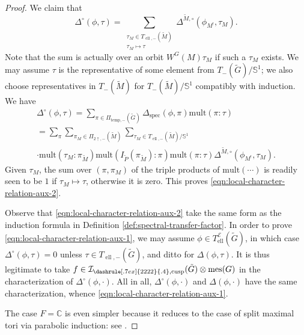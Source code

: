 \documentclass[11pt, a4paper, openany]{book}
\newenvironment{Proof of claim}
  {\renewcommand\qedsymbol{$\blacksquare$}\begin{proof}[Proof of claim]}
  {\end{proof}}
\newcommand{\CC}{\ensuremath{\mathbb{C}}}
\newcommand{\mes}{\operatorname{mes}}
\newcommand{\Endo}{\ensuremath{\mathcal{E}}}
\newcommand{\orbI}{\ensuremath{\mathcal{I}}}
\newcommand{\cusp}{\operatorname{cusp}}
\newcommand{\elli}{\operatorname{ell}}
\newcommand{\asp}{\ensuremath{\dashrule[.7ex]{2 2 2 2}{.4}}} %
\theoremstyle{remark}
\theoremstyle{remark}
\theoremstyle{remark}
\theoremstyle{remark}
\begin{document}
\begin{proof}
	We claim that
	\begin{equation}\label{eqn:local-character-relation-aux-2}
		\Delta^\circ(\phi, \tau) = \sum_{\substack{\tau_M \in T_{\elli, -}(\tilde{M}) \\ \tau_M \mapsto \tau }} \Delta^{\tilde{M}, \circ}(\phi_{M^!}, \tau_M).
	\end{equation}
	Note that the sum is actually over an orbit $W^G(M) \tau_M$ if such a $\tau_M$ exists. We may assume $\tau$ is the representative of some element from $T_-(\tilde{G})/\mathbb{S}^1$; we also choose representatives in $T_-(\tilde{M})$ for $T_-(\tilde{M})/\mathbb{S}^1$ compatibly with induction. We have
	\begin{multline*}
		\Delta^\circ(\phi, \tau) = \sum_{\pi \in \Pi_{\mathrm{temp}, -}(\tilde{G})} \Delta_{\mathrm{spec}}(\phi, \pi) \mathrm{mult}(\pi : \tau) \\
		= \sum_\pi \sum_{\pi_M \in \Pi_{2\uparrow, -}(\tilde{M})} \sum_{\tau_M \in T_{\elli, -}(\tilde{M})/\mathbb{S}^1} \\
		\cdot \mathrm{mult}(\tau_M : \pi_{\tilde{M}}) \mathrm{mult}(I_{\tilde{P}}(\pi_{\tilde{M}}) : \pi ) \mathrm{mult}(\pi : \tau) \Delta^{\tilde{M}, \circ}(\phi_{M^!}, \tau_M).
	\end{multline*}
	Given $\tau_M$, the sum over $(\pi, \pi_M)$ of the triple products of $\mathrm{mult}(\cdots)$ is readily seen to be $1$ if $\tau_M \mapsto \tau$, otherwise it is zero. This proves \eqref{eqn:local-character-relation-aux-2}.
	
	Observe that \eqref{eqn:local-character-relation-aux-2} take the same form as the induction formula in Definition \ref{def:spectral-transfer-factor}. In order to prove \eqref{eqn:local-character-relation-aux-1}, we may assume $\phi \in T^{\Endo}_{\elli}(\tilde{G})$, in which case $\Delta^\circ(\phi, \tau) = 0$ unless $\tau \in T_{\elli, -}(\tilde{G})$, and ditto for $\Delta(\phi, \tau)$. It is thus legitimate to take $f \in \orbI_{\asp, \cusp}(\tilde{G}) \otimes \mes(G)$ in the characterization of $\Delta^\circ(\phi, \cdot)$. All in all, $\Delta^\circ(\phi, \cdot)$ and $\Delta(\phi, \cdot)$ have the same characterization, whence \eqref{eqn:local-character-relation-aux-1}.
	
	The case $F = \CC$ is even simpler because it reduces to the case of split maximal tori via parabolic induction: see \cite[\S 7.6]{Li19}.
\end{proof}
\end{document}
